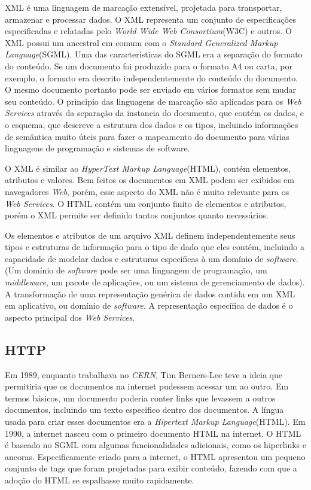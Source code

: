 \documentclass{acm_proc_article-sp}
\begin{document}
		XML é uma linguagem de marcação extensível, projetada para transportar, armazenar e processar dados. O XML representa um conjunto de especificações especificadas e relatadas pelo \emph{World Wide Web Consortium}(W3C) e outros. O XML possui um ancestral em comum com o \emph{Standard Generalized Markup Language}(SGML). Uma das características do SGML era a separação do formato do conteúdo. Se um documento foi produzido para o formato A4 ou carta, por exemplo, o formato era descrito independentemente do conteúdo do documento. O mesmo documento portanto pode ser enviado em vários formatos sem mudar seu conteúdo. O principio das linguagens de marcação são aplicadas para os \emph{Web Services} através da separação da instancia do documento, que contém os dados, e o esquema, que descreve a estrutura dos dados e os tipos, incluindo informações de semântica muito úteis para fazer o mapeamento do documento para várias linguagens de programação e sistemas de software.
		
		O XML é similar ao \emph{HyperText Markup Language}(HTML), contém elementos, atributos e valores. Bem feitos os documentos em XML podem ser exibidos em navegadores \emph{Web}, porém, esse aspecto do XML não é muito relevante para os \emph{Web Services}. O HTML contém um conjunto finito de elementos e atributos, porém o XML permite ser definido tantos conjuntos quanto necessários.
		
		Os elementos e atributos de um arquivo XML definem independentemente seus tipos e estruturas de informação para o tipo de dado que eles contém, incluindo a capacidade de modelar dados e estruturas especificas à um domínio de \emph{software}. (Um domínio de \emph{software} pode ser uma linguagem de programação, um \emph{middleware}, um pacote de aplicações, ou um sistema de gerenciamento de dados). A transformação de uma representação genérica de dados contida em um XML em aplicativo, ou domínio de \emph{software}. A representação específica de dados é o aspecto principal dos \emph{Web Services}.\cite{UNDERWEBSERVICES}
		

	\subsection{HTTP}
	
		Em 1989, enquanto trabalhava no \emph{CERN}, Tim Berners-Lee teve a ideia que permitiria que os documentos na 
		internet pudessem acessar um ao outro. Em termos básicos, um documento poderia conter links que
		levassem a outros documentos, incluindo um texto especifico dentro dos documentos. A língua usada
		para criar esses documentos era a \emph{Hipertext Markup Language}(HTML). Em 1990, a internet nasceu com
		o primeiro documento HTML na internet. O HTML é baseado no SGML com algumas funcionalidades adicionais, como os hiperlinks
		e ancoras. Especificamente criado para a internet, o HTML apresentou um pequeno conjunto de tags que foram projetadas
		para exibir conteúdo, fazendo com que a adoção do HTML se espalhasse muito rapidamente.\cite{PRO_PHPXML}
	
\end{document}
